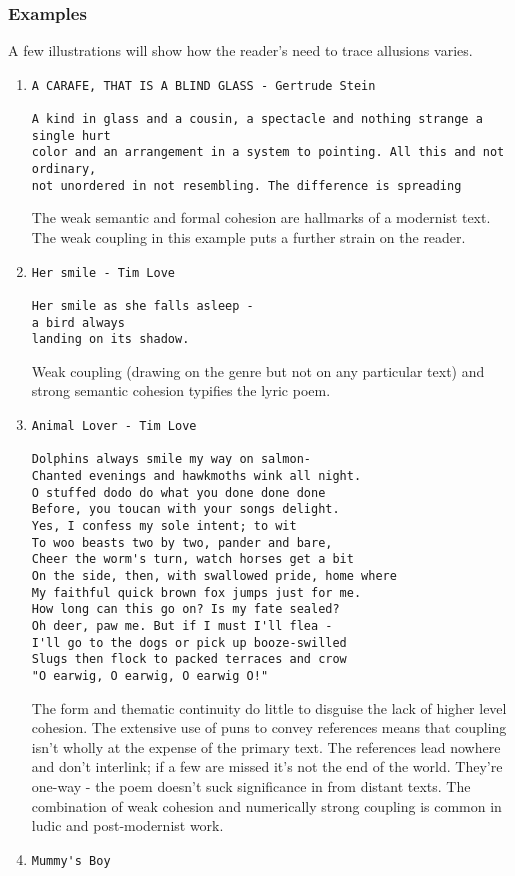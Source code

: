 \documentclass[11pt]{article}
\begin{document}
\subsubsection*{Examples}

A few illustrations will show how the reader's need to trace allusions varies.
\begin{enumerate}
\item 
\begin{verbatim}
A CARAFE, THAT IS A BLIND GLASS - Gertrude Stein

A kind in glass and a cousin, a spectacle and nothing strange a single hurt 
color and an arrangement in a system to pointing. All this and not ordinary, 
not unordered in not resembling. The difference is spreading
\end{verbatim}
The weak semantic and formal cohesion are hallmarks of a modernist text. The weak coupling in this example puts a further strain on the reader.

\item 
\begin{verbatim}
Her smile - Tim Love

Her smile as she falls asleep -
a bird always
landing on its shadow.
\end{verbatim}
Weak coupling (drawing on the genre but not on any particular text) and strong semantic cohesion typifies the lyric poem.
\item 
\begin{verbatim}
Animal Lover - Tim Love

Dolphins always smile my way on salmon-
Chanted evenings and hawkmoths wink all night.
O stuffed dodo do what you done done done
Before, you toucan with your songs delight.
Yes, I confess my sole intent; to wit
To woo beasts two by two, pander and bare,
Cheer the worm's turn, watch horses get a bit
On the side, then, with swallowed pride, home where
My faithful quick brown fox jumps just for me.
How long can this go on? Is my fate sealed?
Oh deer, paw me. But if I must I'll flea -
I'll go to the dogs or pick up booze-swilled
Slugs then flock to packed terraces and crow
"O earwig, O earwig, O earwig O!"
\end{verbatim}
The form and thematic continuity do little to disguise the lack of higher level cohesion. The extensive use of puns to convey references means that coupling isn't wholly at the expense of the primary text. The references lead nowhere and don't interlink; if a few are missed it's not the end of the world. They're one-way - the poem doesn't suck significance in from distant texts. The combination of weak cohesion and numerically strong coupling is common in ludic and post-modernist work.
\item 
\begin{verbatim}
Mummy's Boy


\end{verbatim}
\end{enumerate}
\end{document}

